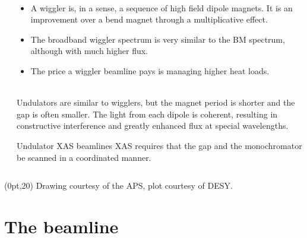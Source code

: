 \documentclass[10pt, xcolor=x11names, compress]{beamer}
\begin{document}
\begin{frame}
\begin{columns}
\begin{column}{0.4\linewidth}
    \end{column}
    \begin{column}{0.6\linewidth}
      \begin{description}[Wig]
        \footnotesize
      \item[Wiggler] ~\\
        \begin{itemize}
          \footnotesize
        \item A wiggler is, in a sense, a sequence of high field
          dipole magnets.  It is an improvement over a bend magnet
          through a multiplicative effect.
        \item The broadband wiggler spectrum is very similar to
          the BM spectrum, although with much higher flux.
        \item The price a wiggler beamline pays is managing higher
          heat loads.
        \end{itemize}
      \item[Undulator] ~\\
        \footnotesize
        Undulators are similar to wigglers, but the magnet period
        is shorter and the gap is often smaller.  The light from each
        dipole is coherent, resulting in constructive interference and
        greatly enhanced flux at special wavelengths.
      \end{description}
      
      \begin{block}{Undulator XAS beamlines}
        \footnotesize
        XAS requires that the gap and the monochromator be scanned in a
        coordinated manner.
      \end{block}
    \end{column}
  \end{columns}

  \begin{textblock*}{0.5\linewidth}(0pt,20\TPVertModule)%
    \tiny%
    Drawing courtesy of the APS, plot courtesy of DESY.
  \end{textblock*}
\end{frame}


\section{The beamline}
\label{sec:bl}
\end{document}
